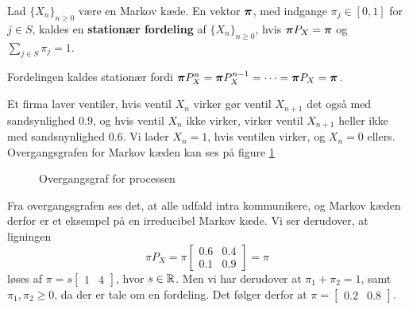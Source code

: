 \begin{defn}
Lad $\{X_n\}_{n \geq 0}$ være en Markov kæde. En vektor $\boldsymbol{\pi}$, med indgange $\pi_j \in [0,1]$ for $j \in S$, kaldes en \textbf{stationær fordeling} af $\{X_n\}_{n \geq 0}$, hvis $\boldsymbol{\pi}P_X = \boldsymbol{\pi}$ og $\displaystyle \sum_{j \in S} \pi_j = 1$.
\end{defn}
Fordelingen kaldes stationær fordi $\boldsymbol{\pi} P_X^n = \boldsymbol{\pi} P_X^{n - 1} = \cdots = \boldsymbol{\pi} P_X = \boldsymbol{\pi}$.
\begin{example}
  Et firma laver ventiler, hvis ventil $X_{n}$ virker gør ventil $X_{n + 1}$ det også med sandsynlighed $0.9$, og hvis ventil $X_{n}$ ikke virker, virker ventil $X_{n + 1}$ heller ikke med sandsnynlighed $0.6$. Vi lader $X_{n} = 1$, hvis ventilen virker, og $X_{n} = 0$ ellers. Overgangsgrafen for Markov kæden kan ses på figure \ref{fig:eksempel_stationary}
  \begin{figure}[H]
    \centering
    \caption{Overgangsgraf for processen}
    \label{fig:eksempel_stationary}
  \end{figure}\noindent
  Fra overgangsgrafen ses det, at alle udfald intra kommunikere, og Markov kæden derfor er et eksempel på en irreducibel Markov kæde. Vi ser derudover, at ligningen
  \begin{equation*}
    \pi P_{X} = \pi \begin{bmatrix}
                      0.6 & 0.4 \\ 0.1 & 0.9
                    \end{bmatrix} = \pi
  \end{equation*}
  løses af $\pi = s \begin{bmatrix} 1 & 4 \end{bmatrix}$, hvor $s \in \mathbb{R}$.
  Men vi har derudover at $\pi_{1} + \pi_{2} = 1$, samt $\pi_{1}, \pi_{2} \geq 0$, da der er tale om en fordeling.
  Det følger derfor at $\pi = \begin{bmatrix} 0.2 & 0.8 \end{bmatrix}$.
\end{example}
